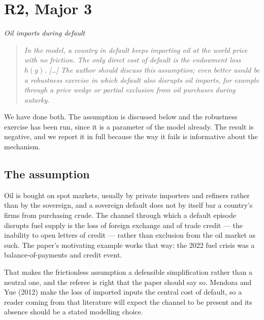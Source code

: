 
\section{R2, Major 3}
{\itshape Oil imports during default}

\begin{quote}\itshape
In the model, a country in default keeps importing oil at the world price with
no friction. The only direct cost of default is the endowment loss $h(y)$.
[\ldots] The author should discuss this assumption; even better would be a
robustness exercise in which default also disrupts oil imports, for example
through a price wedge or partial exclusion from oil purchases during autarky.
\end{quote}

We have done both. The assumption is discussed below and the robustness
exercise has been run, since it is a parameter of the model already. The result
is negative, and we report it in full because the way it fails is informative
about the mechanism.

\subsection*{The assumption}

Oil is bought on spot markets, usually by private importers and refiners rather
than by the sovereign, and a sovereign default does not by itself bar a
country's firms from purchasing crude. The channel through which a default
episode disrupts fuel supply is the loss of foreign exchange and of trade
credit --- the inability to open letters of credit --- rather than exclusion
from the oil market as such. The paper's motivating example works that way: the
2022 fuel crisis was a balance-of-payments and credit event.

That makes the frictionless assumption a defensible simplification rather than a
neutral one, and the referee is right that the paper should say so. Mendoza and
Yue (2012) make the loss of imported inputs the central cost of default, so a
reader coming from that literature will expect the channel to be present and its
absence should be a stated modelling choice.

